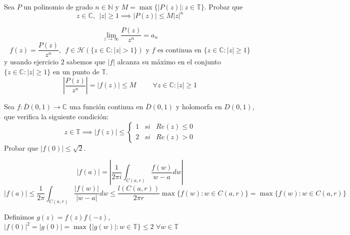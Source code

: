 \begin{ejer}
	Sea $P$ un polinomio de grado $n\in\mathbb{N}$ y $M = \max\{ |P(z)| : z\in\mathbb{T} \}$. Probar que
	$$ z\in\mathbb{C},\ \ |z|\geq 1 \implies |P(z)| \leq M|z|^n $$
\end{ejer}
\begin{sol}
$$\lim_{z\rightarrow\infty} \frac{P(z)}{z^n} = a_n$$
$$f(z) = \frac{P(z)}{z^n}, \ \ f\in\mathcal{H}(\{ z\in\mathbb{C} : |z|>1 \}) \text{ y $f$ es continua en }\{ z\in\mathbb{C} : |z|\geq 1 \}$$
y usando ejercicio $2$ sabemos que
$|f|$ alcanza su máximo en el conjunto $\{ z\in\mathbb{C} : |z|\geq 1 \}$ en un punto de $\mathbb{T}$.
$$\left| \frac{P(z)}{z^n} \right| = |f(z)| \leq M \hspace{1cm} \forall z\in\mathbb{C} : |z|\geq 1$$
\end{sol}


\begin{ejer}
	Sea $f:\overline{D}(0,1)\rightarrow\mathbb{C}$ una función continua en $\overline{D}(0,1)$ y holomorfa en $D(0,1)$, que verifica la siguiente condición:
	$$ z\in\mathbb{T} \implies |f(z)| \leq \left\{ \begin{array}{lcc}
	1 &  si  & Re(z) \leq 0 \\
	2 &  si  & Re(z) > 0
	\end{array}
	\right. $$
	Probar que $|f(0)| \leq \sqrt{2}$.
\end{ejer}
\begin{sol}
$$|f(a)| = \left| \frac{1}{2\pi i}\int_{C(a,r)} \frac{f(w)}{w-a} dw \right|$$
$$|f(a)| \leq \frac{1}{2\pi} \int_{C(a,r)} \frac{|f(w)|}{|w-a|} dw \leq \frac{l(C(a,r))}{2\pi r} \max\{ f(w) : w\in C(a,r) \} = \max\{ f(w) : w\in C(a,r) \} $$

Definimos $g(z) = f(z)f(-z)$, 
$|f(0)|^2 = |g(0)| = \max\{ |g(w)| : w\in\mathbb{T} \} \leq 2$ $\forall w\in\mathbb{T}$
\end{sol}


